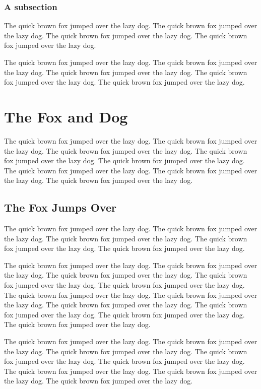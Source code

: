 \documentclass{l4proj}
\begin{document}
\subsection{A subsection}
The quick brown fox jumped over the lazy dog.
The quick brown fox jumped over the lazy dog.
The quick brown fox jumped over the lazy dog.
The quick brown fox jumped over the lazy dog.

The quick brown fox jumped over the lazy dog.
The quick brown fox jumped over the lazy dog.
The quick brown fox jumped over the lazy dog.
The quick brown fox \cite{fahle} jumped over the lazy dog.
The quick brown fox jumped over the lazy dog.

\chapter{The Fox and Dog}
The quick brown fox jumped over the lazy dog.
The quick brown fox jumped over the lazy dog.
The quick brown fox jumped over the lazy dog.
The quick brown fox jumped over the lazy dog.
The quick brown fox jumped over the lazy dog.
The quick brown fox jumped over the lazy dog.
The quick brown fox jumped over the lazy dog.
The quick brown fox jumped over the lazy dog.

\section{The Fox Jumps Over}
The quick brown fox jumped over the lazy dog.
The quick brown fox jumped over the lazy dog.
The quick brown fox jumped over the lazy dog.
The quick brown fox jumped over the lazy dog.
The quick brown fox jumped over the lazy dog.

The quick brown fox jumped over the lazy dog.
The quick brown fox jumped over the lazy dog.
The quick brown fox jumped over the lazy dog.
The quick brown fox jumped over the lazy dog.
The quick brown fox jumped over the lazy dog.
The quick brown fox jumped over the lazy dog.
The quick brown fox jumped over the lazy dog.
The quick brown fox jumped over the lazy dog.
The quick brown fox jumped over the lazy dog.
The quick brown fox jumped over the lazy dog.
The quick brown fox jumped over the lazy dog.

The quick brown fox jumped over the lazy dog.
The quick brown fox jumped over the lazy dog.
The quick brown fox jumped over the lazy dog.
The quick brown fox jumped over \cite{ckt} the lazy dog.
The quick brown fox jumped over the lazy dog.
The quick brown fox jumped over the lazy dog.
The quick brown fox jumped over the lazy dog.
The quick brown fox jumped over the lazy dog.
\end{document}
